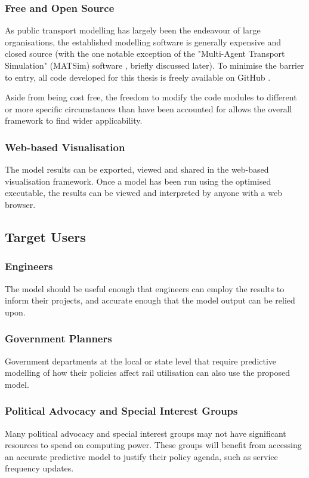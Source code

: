 \subsubsection{Free and Open Source}
As public transport modelling has largely been the endeavour of large organisations, the established modelling software is generally expensive and closed source (with the one notable exception of the "Multi-Agent Transport Simulation" (MATSim) software \cite{horniMultiAgentTransportSimulation2016}, briefly discussed later). To minimise the barrier to entry, all code developed for this thesis is freely available on GitHub \cite{bensutherlandArupHonsGC24Trainute2024}.

Aside from being cost free, the freedom to modify the code modules to different or more specific circumstances than have been accounted for allows the overall framework to find wider applicability.
\subsubsection{Web-based Visualisation}
The model results can be exported, viewed and shared in the web-based visualisation framework. Once a model has been run using the optimised executable, the results can be viewed and interpreted by anyone with a web browser.
\subsection{Target Users}
\subsubsection{Engineers}
The model should be useful enough that engineers can employ the results to inform their projects, and accurate enough that the model output can be relied upon.
\subsubsection{Government Planners}
Government departments at the local or state level that require predictive modelling of how their policies affect rail utilisation can also use the proposed model.
\subsubsection{Political Advocacy and Special Interest Groups}
Many political advocacy and special interest groups may not have significant resources to spend on computing power. These groups will benefit from accessing an accurate predictive model to justify their policy agenda, such as service frequency updates.
